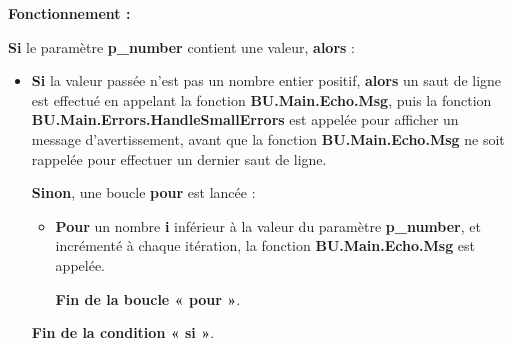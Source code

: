 \documentclass[a4paper,10pt]{article}
\begin{document}
    \begin{justify}
        \textbf{Fonctionnement :}

        \textbf{\color{cond}Si} le paramètre \textbf{\color{vars}p\_number} contient une valeur, \textbf{\color{cond}alors} :

        \begin{itemize}
            \item
            {
                \begin{justify}
                    \textbf{\color{cond}Si} la valeur passée n'est pas un nombre entier positif, \textbf{\color{cond}alors} un saut de ligne est effectué en appelant la fonction \textbf{\color{func}BU.Main.Echo.Msg}, puis la fonction \textbf{\color{func}BU.Main.Errors.HandleSmallErrors} est appelée pour afficher un message d'avertissement, avant que la fonction \textbf{\color{func}BU.Main.Echo.Msg} ne soit rappelée pour effectuer un dernier saut de ligne.
                \end{justify}

                \setlength{\parskip}{1em}

                \begin{justify}
                    \textbf{\color{cond}Sinon}, une boucle \textbf{\color{loop}pour} est lancée :

                    \begin{itemize}
                        \item
                        {
                            \begin{justify}
                                \textbf{\color{loop}Pour} un nombre \textbf{\color{vars}i} inférieur à la valeur du paramètre \textbf{\color{vars}p\_number}, et incrémenté à chaque itération, la fonction \textbf{\color{func}BU.Main.Echo.Msg} est appelée.
                            \end{justify}

                            \setlength{\parskip}{1em}

                            \begin{justify}
                                \textbf{\color{loop}Fin de la boucle « pour »}.
                            \end{justify}
                        }
                    \end{itemize}
                \end{justify}

                \begin{justify}
                    \textbf{\color{cond}Fin de la condition « si »}.
                \end{justify}
            }
        \end{itemize}
    \end{justify}
\end{document}

